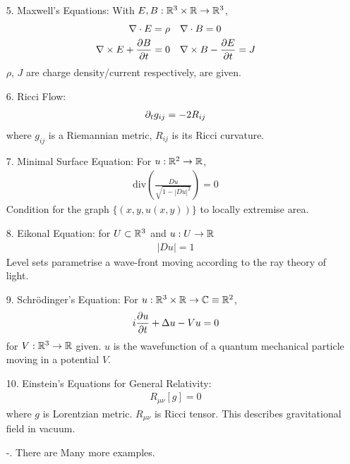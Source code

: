 \documentclass[12pt,a4paper]{report}
\begin{document}
\begin{itemize}
\item[5.] Maxwell's Equations:
With $E,B : \mathbb{R}^3 \times \mathbb{R} \rightarrow \mathbb{R}^3$,
\begin{align*}
\nabla \cdot E = \rho & \quad \nabla \cdot B =0 \\
\nabla \times E + \frac{\partial B}{\partial t} =0 & \quad \nabla \times B - \frac{\partial E}{\partial t} = J
\end{align*}
$\rho$, $J$ are charge density/current respectively, are given.

\item[6.] Ricci Flow:
\begin{align*}
\partial_t g_{ij} = -2R_{ij}
\end{align*}
where $g_{ij}$ is a Riemannian metric, $R_{ij}$ is its Ricci curvature.

\item[7.] Minimal Surface Equation:
For $u: \mathbb{R}^2 \rightarrow \mathbb{R}$,
\begin{align*}
\text{div}(\frac{Du}{\sqrt{1-|Du|^2}}) =0
\end{align*}
Condition for the graph $\{ (x,y,u(x,y)) \}$ to locally extremise area.

\item[8.] Eikonal Equation:
for $U\subset \mathbb{R}^3$ and $u:U\rightarrow \mathbb{R}$
\begin{align*}
|Du|=1
\end{align*}
Level sets parametrise a wave-front moving according to the ray theory of light. 

\item[9.] Schr\"{o}dinger's Equation:
For $u:\mathbb{R}^3 \times \mathbb{R} \rightarrow \mathbb{C} \equiv \mathbb{R}^2$,
\begin{align*}
i\frac{\partial u}{\partial t} + \Delta u - Vu =0
\end{align*}
for $V: \mathbb{R}^3\rightarrow \mathbb{R}$ given. $u$ is the wavefunction of a quantum mechanical particle moving in a potential $V$.

\item[10.] Einstein's Equations for General Relativity:
\begin{align*}
R_{\mu \nu}[g] =0
\end{align*}
where $g$ is Lorentzian metric. $R_{\mu \nu}$ is Ricci tensor. This describes gravitational field in vacuum.

\item[-.] There are Many more examples.
\end{itemize}
\end{document}
